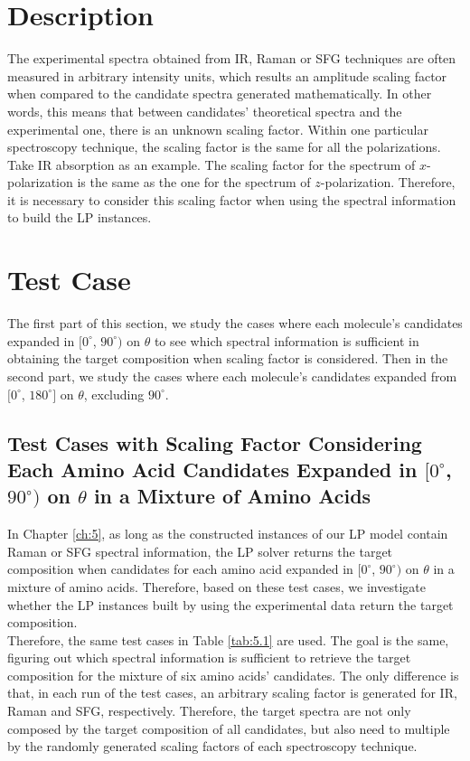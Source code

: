  \label{ch:6}
\section{Description}
The experimental spectra obtained from IR, Raman or SFG techniques are often measured in arbitrary intensity units, which results an amplitude scaling factor when compared to the candidate spectra generated mathematically. In other words, this means that between candidates' theoretical spectra and the experimental one, there is an unknown scaling factor. Within one particular spectroscopy technique, the scaling factor is the same for all the polarizations. Take IR absorption as an example. The scaling factor for the spectrum of $x$-polarization is the same as the one for the spectrum of $z$-polarization. Therefore, it is necessary to consider this scaling factor when using the spectral information to build the LP instances. \\

\section{Test Case}
The first part of this section, we study the cases where each molecule's candidates expanded in $[0^{\circ}$, $90^{\circ})$ on $\theta$ to see which spectral information is sufficient in obtaining the target composition when scaling factor is considered. Then in the second part, we study the cases where each molecule's candidates expanded from $[0^{\circ}$, $180^{\circ}]$ on $\theta$, excluding $90^{\circ}$. \\

\subsection{Test Cases with Scaling Factor Considering Each Amino Acid Candidates Expanded in $[0^{\circ}$, $90^{\circ})$ on $\theta$ in a Mixture of Amino Acids}
In Chapter \ref{ch:5}, as long as the constructed instances of our LP model contain Raman or SFG spectral information, the LP solver returns the target composition when candidates for each amino acid expanded in $[0^{\circ}$, $90^{\circ})$ on $\theta$ in a mixture of amino acids. Therefore, based on these test cases, we investigate whether the LP instances built by using the experimental data return the target composition.\\

Therefore, the same test cases in Table \ref{tab:5.1} are used. The goal is the same, figuring out which spectral information is sufficient to retrieve the target composition for the mixture of six amino acids' candidates. The only difference is that, in each run of the test cases, an arbitrary scaling factor is generated for IR, Raman and SFG, respectively. Therefore, the target spectra are not only composed by the target composition of all candidates, but also need to multiple by the randomly generated scaling factors of each spectroscopy technique. \\

